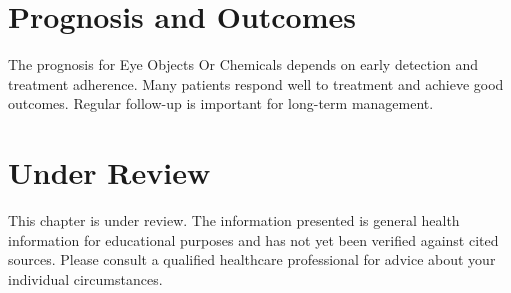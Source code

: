 \section*{Prognosis and Outcomes}
The prognosis for Eye Objects Or Chemicals depends on early detection and treatment adherence. Many patients respond well to treatment and achieve good outcomes. Regular follow-up is important for long-term management.
\section*{Under Review}
This chapter is under review. The information presented is general health information for educational purposes and has not yet been verified against cited sources. Please consult a qualified healthcare professional for advice about your individual circumstances.


\clearpage
